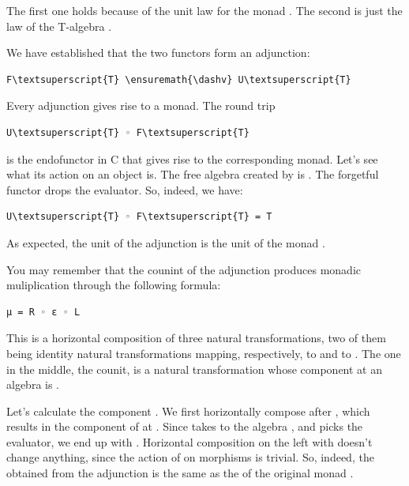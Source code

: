 \noindent
The first one holds because of the unit law for the monad .
The second is just the law of the T-algebra .

We have established that the two functors form an adjunction:

\begin{Verbatim}[commandchars=\\\{\}]
F\textsuperscript{T} \ensuremath{\dashv} U\textsuperscript{T}
\end{Verbatim}
Every adjunction gives rise to a monad. The round trip

\begin{Verbatim}[commandchars=\\\{\}]
U\textsuperscript{T} ◦ F\textsuperscript{T}
\end{Verbatim}
is the endofunctor in C that gives rise to the corresponding monad.
Let's see what its action on an object  is. The free algebra
created by  is . The forgetful functor
 drops the evaluator. So, indeed, we have:

\begin{Verbatim}[commandchars=\\\{\}]
U\textsuperscript{T} ◦ F\textsuperscript{T} = T
\end{Verbatim}
As expected, the unit of the adjunction is the unit of the monad
.

You may remember that the counint of the adjunction produces monadic
muliplication through the following formula:

\begin{Verbatim}[commandchars=\\\{\}]
μ = R ◦ ε ◦ L
\end{Verbatim}
This is a horizontal composition of three natural transformations, two
of them being identity natural transformations mapping, respectively,
 to  and  to . The one in the
middle, the counit, is a natural transformation whose component at an
algebra  is .

Let's calculate the component . We first horizontally compose
 after , which results in the component of
 at . Since  takes  to the
algebra , and  picks the evaluator, we end
up with . Horizontal composition on the left with 
doesn't change anything, since the action of  on morphisms is
trivial. So, indeed, the  obtained from the adjunction is the
same as the  of the original monad .


